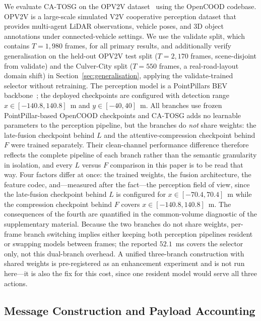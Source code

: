 \documentclass[journal]{IEEEtran}
\newcommand{\method}{CA-TOSG}
\begin{document}
We evaluate \method{} on the OPV2V dataset~\cite{xu2022opv2v} using the OpenCOOD codebase. OPV2V is a large-scale simulated V2V cooperative perception dataset that provides multi-agent LiDAR observations, vehicle poses, and 3D object annotations under connected-vehicle settings. We use the validate split, which contains $T=1{,}980$ frames, for all primary results, and additionally verify generalisation on the held-out OPV2V test split ($T=2{,}170$ frames, scene-disjoint from validate) and the Culver-City split ($T=550$ frames, a real-road-layout domain shift) in Section~\ref{sec:generalisation}, applying the validate-trained selector without retraining. The perception model is a PointPillars BEV backbone~\cite{lang2019pointpillars}; the deployed checkpoints are configured with detection range $x \in [-140.8, 140.8]$~m and $y \in [-40, 40]$~m. All branches use frozen PointPillar-based OpenCOOD checkpoints and \method{} adds no learnable parameters to the perception pipeline, but the branches do \emph{not} share weights: the late-fusion checkpoint behind $L$ and the attentive-compression checkpoint behind $F$ were trained separately. Their clean-channel performance difference therefore reflects the complete pipeline of each branch rather than the semantic granularity in isolation, and every $L$ versus $F$ comparison in this paper is to be read that way. Four factors differ at once: the trained weights, the fusion architecture, the feature codec, and---measured after the fact---the perception field of view, since the late-fusion checkpoint behind $L$ is configured for $x \in [-70.4, 70.4]$~m while the compression checkpoint behind $F$ covers $x \in [-140.8, 140.8]$~m. The consequences of the fourth are quantified in the common-volume diagnostic of the supplementary material. Because the two branches do not share weights, per-frame branch switching implies either keeping both perception pipelines resident or swapping models between frames; the reported $52.1$~ms covers the selector only, not this dual-branch overhead. A unified three-branch construction with shared weights is pre-registered as an enhancement experiment and is not run here---it is also the fix for this cost, since one resident model would serve all three actions.

\subsection{Message Construction and Payload Accounting}
\end{document}
